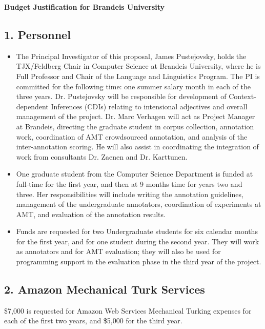 \documentclass[11pt]{article}
\begin{document}
\begin{center}
{\large {\bf Budget Justification for Brandeis University}}
\end{center}

 \vspace{-1.0em}
\subsection*{1. Personnel}


\begin{itemize}

\item The Principal Investigator of this proposal, James Pustejovsky, holds the TJX/Feldberg Chair in Computer Science at Brandeis University, where he is Full Professor and Chair of the Language and Linguistics Program. The PI is committed for the following time: one summer salary month in each of the three years.  Dr. Pustejovsky will be responsible for   development of Context-dependent Inferences (CDIs) relating to intensional adjectives and overall management of the project. Dr. Marc Verhagen will act as Project Manager at Brandeis, directing the graduate student in corpus collection, annotation work, coordination of AMT crowdsourced annotation, and analysis of the inter-annotation scoring. He will also assist in coordinating the integration of work from consultants Dr. Zaenen and Dr. Karttunen. 

 
\item One graduate student from the Computer Science Department is funded at full-time for the first year, and then at 9 months time for years two and three.  Her responsibilities will include writing the annotation guidelines, management of the undergraduate annotators, coordination of experiments at AMT, and 
 evaluation of the annotation results. 
 
\item Funds are requested for two Undergraduate students for six  calendar months for the first year, and for one student  during the second year. They will work as annotators and for AMT evaluation; they will also be used for programming support in the evaluation phase in the third year of the project.  

\end{itemize}

\subsection*{2.  Amazon Mechanical Turk Services}
\$7,000 is requested for Amazon Web Services  Mechanical Turking expenses for each of the first two years, and \$5,000 for the third year.  
\end{document}
